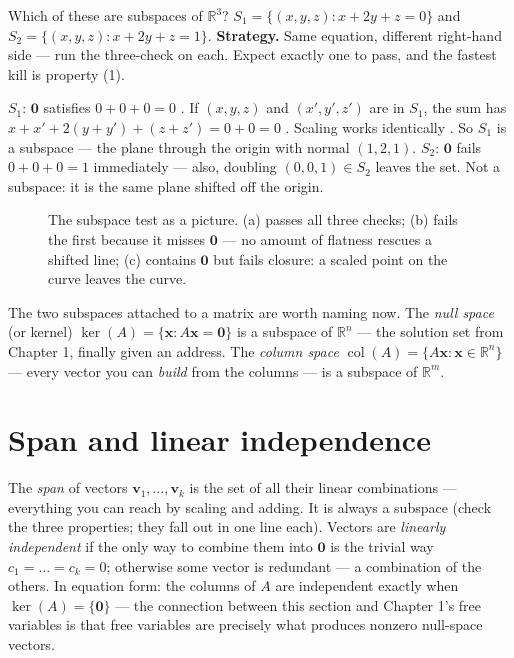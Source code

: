 \begin{example}\label{ex:subtest}
Which of these are subspaces of $\mathbb{R}^3$?
$S_1=\{(x,y,z):x+2y+z=0\}$ and $S_2=\{(x,y,z):x+2y+z=1\}$.
\textbf{Strategy.} Same equation, different right-hand side — run the three-check on each. Expect exactly one to pass, and the fastest kill is property (1).
\begin{solution}
$S_1$: $\mathbf{0}$ satisfies $0+0+0=0$ \checkmark. If $(x,y,z)$ and $(x',y',z')$ are in $S_1$, the sum has $x+x'+2(y+y')+(z+z')=0+0=0$ \checkmark. Scaling works identically \checkmark. So $S_1$ is a subspace — the plane through the origin with normal $(1,2,1)$.
$S_2$: $\mathbf{0}$ fails $0+0+0=1$ immediately — also, doubling $(0,0,1)\in S_2$ leaves the set. Not a subspace: it is the same plane shifted off the origin.
\end{solution}
\end{example}

\begin{figure}[htbp]
\centering

\caption{The subspace test as a picture. (a) passes all three checks; (b) fails the first because it misses $\mathbf 0$ — no amount of flatness rescues a shifted line; (c) contains $\mathbf 0$ but fails closure: a scaled point on the curve leaves the curve.}
\label{fig:subtest}
\end{figure}

The two subspaces attached to a matrix are worth naming now. The \emph{null space} (or kernel) $\ker(A)=\{\mathbf{x}:A\mathbf{x}=\mathbf{0}\}$ is a subspace of $\mathbb{R}^n$ — the solution set from Chapter 1, finally given an address. The \emph{column space} $\operatorname{col}(A)=\{A\mathbf{x}:\mathbf{x}\in\mathbb{R}^n\}$ — every vector you can \emph{build} from the columns — is a subspace of $\mathbb{R}^m$.

\section{Span and linear independence}\label{sec:spanindep}

The \emph{span} of vectors $\mathbf{v}_1,\dots,\mathbf{v}_k$ is the set of all their linear combinations — everything you can reach by scaling and adding. It is always a subspace (check the three properties; they fall out in one line each). Vectors are \emph{linearly independent} if the only way to combine them into $\mathbf{0}$ is the trivial way $c_1=\dots=c_k=0$; otherwise some vector is redundant — a combination of the others. In equation form: the columns of $A$ are independent exactly when $\ker(A)=\{\mathbf{0}\}$ — the connection between this section and Chapter 1's free variables is that free variables are precisely what produces nonzero null-space vectors.

